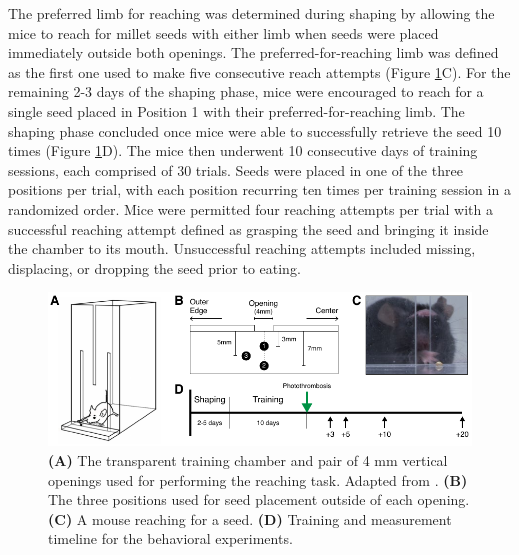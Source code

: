 The preferred limb for reaching was determined during shaping by allowing the mice to reach for millet seeds with either limb when seeds were placed immediately outside both openings. The preferred-for-reaching limb was defined as the first one used to make five consecutive reach attempts (Figure \ref{fig:reachingtask}C). For the remaining 2-3 days of the shaping phase, mice were encouraged to reach for a single seed placed in Position 1 with their preferred-for-reaching limb. The shaping phase concluded once mice were able to successfully retrieve the seed 10 times (Figure \ref{fig:reachingtask}D). The mice then underwent 10 consecutive days of training sessions, each comprised of 30 trials. Seeds were placed in one of the three positions per trial, with each position recurring ten times per training session in a randomized order. Mice were permitted four reaching attempts per trial with a successful reaching attempt defined as grasping the seed and bringing it inside the chamber to its mouth. Unsuccessful reaching attempts included missing, displacing, or dropping the seed prior to eating.

\begin{figure}
    \includegraphics{figures/chapter_3/reachingtask.pdf}
    \caption[\textbf{(A)} The transparent training chamber and pair of 4 mm vertical openings used for performing the reaching task. \textbf{(B)} The three positions used for seed placement outside of each opening. \textbf{(C)} A mouse reaching for a seed. \textbf{(D)} Training and measurement timeline for the behavioral experiments.]{
        \label{fig:reachingtask}
        \textbf{(A)} The transparent training chamber and pair of 4 mm vertical openings used for performing the reaching task. Adapted from \cite{Chen:2014hy}. \textbf{(B)} The three positions used for seed placement outside of each opening. \textbf{(C)} A mouse reaching for a seed. \textbf{(D)} Training and measurement timeline for the behavioral experiments.
    }
\end{figure}

